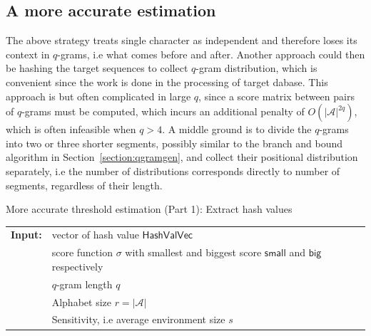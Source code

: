 \documentclass[twoside,a4paper,bsc]{master}
\newcommand{\Qgram}[1]{\(#1\)-gram}
\newcommand{\Append}[0]{\mathsf{append}}
\newcommand{\HashValue}[0]{\mathsf{HashValue}}
\newcommand{\HashValVec}[0]{\mathsf{HashValVec}}
\newcommand{\Small}[0]{\mathsf{small}}
\newcommand{\Biggg}[0]{\mathsf{big}}
\newcommand{\DivFactors}[0]{\mathsf{divFactors}}
\newcommand{\DivFactor}[0]{\mathsf{divFactor}}
\newcommand{\ModFactors}[0]{\mathsf{modFactors}}
\newcommand{\Alpha}[0]{\mathcal{A}}
\newcommand{\Qsplit}{\mathsf{QS}}
\begin{document}
\subsection{A more accurate estimation}
The above strategy treats single character as
independent and therefore loses its context in \Qgram{q}s, i.e what comes
before
and after. Another approach could then be hashing the target sequences to
collect \Qgram{q} distribution, which is convenient since the work is done
in
the processing of target dabase. This approach is but often complicated in
large \(q\), since a score matrix between pairs of \Qgram{q}s must be
computed,
which incurs an additional penalty of \(O(|\Alpha|^{2q})\), which is often
infeasible when \(q>4\).
A middle ground is to divide the \Qgram{q}s
into two or three shorter segments, possibly similar to the branch and
bound
algorithm in Section~\ref{section:qgramgen}, and collect their positional
distribution separately, i.e the number of distributions corresponds
directly to
number of segments, regardless of their length.
\begin{algorithm}[t]
\caption{More accurate threshold estimation (Part 1): Extract hash values}
\label{code:ctxsens1}
\begin{tabular}{@{}l@{~}l}
\textbf{Input:}&vector of hash value \(\HashValVec\)\\
&score function \(\sigma\) with smallest and biggest score \(\Small\) and
\(\Biggg\)
respectively\\
&\Qgram{q} length \(q\)\\
&Alphabet size \(r = |\Alpha|\)\\
&Sensitivity, i.e average environment size \(s\)
\end{tabular}
\begin{algorithmic}
\State \(\ModFactors \gets []\)
\State \(\DivFactors \gets []\)
\For{\(i\in[0,|\Qsplit(q)|)\)}
\State \(\ModFactors.\Append(r^{\Qsplit(q)[i]})\)
\State \(\DivFactor \gets 1\)
\For{\(j\in[i+1,|\Qsplit(q)|)\)}
\State \(\DivFactor\text{ \(\cdot\)= }\Qsplit(q)[j]\)
\EndFor
\State \(\DivFactors.\Append(\DivFactor)\)
\EndFor
\State \(d \gets []\)
\For{\(i\in[0,|\Qsplit(q)|)\)}\Comment{Extract hash values of segments}
\State \(d.\Append([0] \times \ModFactors[i])\)
\EndFor
\For{\(\HashValue\in\HashValVec\)}
\For{\(i\in[0,|\Qsplit(q)|)\)}
\State \(\HashValue_i \gets (\frac{\HashValue}{\DivFactors[i]}) \%
\ModFactors[i]\)\Comment{Integer division}
\State \(d[i][\HashValue_i]\text{ += }1\)
\EndFor
\EndFor
\end{algorithmic}
\end{algorithm}
\end{document}
